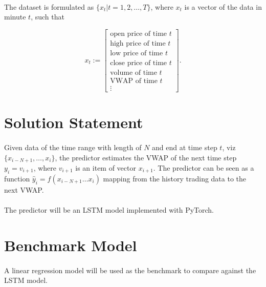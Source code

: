 \documentclass[12pt, letterpaper]{article}
\begin{document}
\paragraph{}
The dataset is formulated as $\{x_t|t=1,2,\dots,T\}$, where $x_t$ is a vector of the data in minute $t$, such that

\begin{equation*}
    x_t := \begin{bmatrix}
        \text{open price of time }t \\
        \text{high price of time }t \\
        \text{low price of time }t \\
        \text{close price of time }t \\
        \text{volume of time }t \\
        \text{VWAP of time }t \\
        \vdots
    \end{bmatrix}.
\end{equation*}

\section{Solution Statement}

\paragraph{}
Given data of the time range with length of $N$ and end at time step $t$, viz $\{x_{i-N+1},\dots,x_i\}$, the predictor estimates the VWAP of the next time step $y_i=v_{i+1}$, where $v_{i+1}$ is an item of vector $x_{i+1}$. The predictor can be seen as a function $\hat y_i=f(x_{i-N+1}\dots x_i)$ mapping from the history trading data to the next VWAP.

\paragraph{}
The predictor will be an LSTM model implemented with PyTorch.

\section{Benchmark Model}

\paragraph{}
A linear regression model will be used as the benchmark to compare against the LSTM model.
\end{document}
